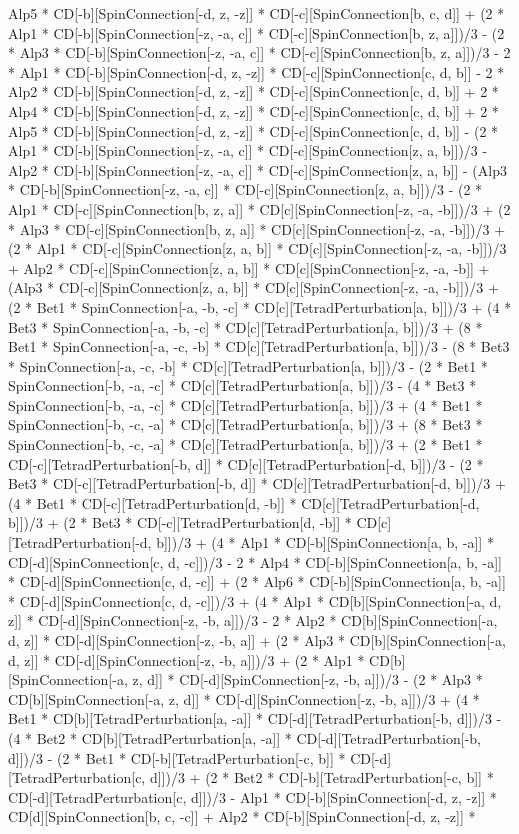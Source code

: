 Alp5 * CD[-b][SpinConnection[-d, z, -z]] * CD[-c][SpinConnection[b, c, d]] + (2 * Alp1 * CD[-b][SpinConnection[-z, -a, c]] * CD[-c][SpinConnection[b, z, a]])/3 - (2 * Alp3 * CD[-b][SpinConnection[-z, -a, c]] * CD[-c][SpinConnection[b, z, a]])/3 - 2 * Alp1 * CD[-b][SpinConnection[-d, z, -z]] * CD[-c][SpinConnection[c, d, b]] - 2 * Alp2 * CD[-b][SpinConnection[-d, z, -z]] * CD[-c][SpinConnection[c, d, b]] + 2 * Alp4 * CD[-b][SpinConnection[-d, z, -z]] * CD[-c][SpinConnection[c, d, b]] + 2 * Alp5 * CD[-b][SpinConnection[-d, z, -z]] * CD[-c][SpinConnection[c, d, b]] - (2 * Alp1 * CD[-b][SpinConnection[-z, -a, c]] * CD[-c][SpinConnection[z, a, b]])/3 - Alp2 * CD[-b][SpinConnection[-z, -a, c]] * CD[-c][SpinConnection[z, a, b]] - (Alp3 * CD[-b][SpinConnection[-z, -a, c]] * CD[-c][SpinConnection[z, a, b]])/3 - (2 * Alp1 * CD[-c][SpinConnection[b, z, a]] * CD[c][SpinConnection[-z, -a, -b]])/3 + (2 * Alp3 * CD[-c][SpinConnection[b, z, a]] * CD[c][SpinConnection[-z, -a, -b]])/3 + (2 * Alp1 * CD[-c][SpinConnection[z, a, b]] * CD[c][SpinConnection[-z, -a, -b]])/3 + Alp2 * CD[-c][SpinConnection[z, a, b]] * CD[c][SpinConnection[-z, -a, -b]] + (Alp3 * CD[-c][SpinConnection[z, a, b]] * CD[c][SpinConnection[-z, -a, -b]])/3 + (2 * Bet1 * SpinConnection[-a, -b, -c] * CD[c][TetradPerturbation[a, b]])/3 + (4 * Bet3 * SpinConnection[-a, -b, -c] * CD[c][TetradPerturbation[a, b]])/3 + (8 * Bet1 * SpinConnection[-a, -c, -b] * CD[c][TetradPerturbation[a, b]])/3 - (8 * Bet3 * SpinConnection[-a, -c, -b] * CD[c][TetradPerturbation[a, b]])/3 - (2 * Bet1 * SpinConnection[-b, -a, -c] * CD[c][TetradPerturbation[a, b]])/3 - (4 * Bet3 * SpinConnection[-b, -a, -c] * CD[c][TetradPerturbation[a, b]])/3 + (4 * Bet1 * SpinConnection[-b, -c, -a] * CD[c][TetradPerturbation[a, b]])/3 + (8 * Bet3 * SpinConnection[-b, -c, -a] * CD[c][TetradPerturbation[a, b]])/3 + (2 * Bet1 * CD[-c][TetradPerturbation[-b, d]] * CD[c][TetradPerturbation[-d, b]])/3 - (2 * Bet3 * CD[-c][TetradPerturbation[-b, d]] * CD[c][TetradPerturbation[-d, b]])/3 + (4 * Bet1 * CD[-c][TetradPerturbation[d, -b]] * CD[c][TetradPerturbation[-d, b]])/3 + (2 * Bet3 * CD[-c][TetradPerturbation[d, -b]] * CD[c][TetradPerturbation[-d, b]])/3 + (4 * Alp1 * CD[-b][SpinConnection[a, b, -a]] * CD[-d][SpinConnection[c, d, -c]])/3 - 2 * Alp4 * CD[-b][SpinConnection[a, b, -a]] * CD[-d][SpinConnection[c, d, -c]] + (2 * Alp6 * CD[-b][SpinConnection[a, b, -a]] * CD[-d][SpinConnection[c, d, -c]])/3 + (4 * Alp1 * CD[b][SpinConnection[-a, d, z]] * CD[-d][SpinConnection[-z, -b, a]])/3 - 2 * Alp2 * CD[b][SpinConnection[-a, d, z]] * CD[-d][SpinConnection[-z, -b, a]] + (2 * Alp3 * CD[b][SpinConnection[-a, d, z]] * CD[-d][SpinConnection[-z, -b, a]])/3 + (2 * Alp1 * CD[b][SpinConnection[-a, z, d]] * CD[-d][SpinConnection[-z, -b, a]])/3 - (2 * Alp3 * CD[b][SpinConnection[-a, z, d]] * CD[-d][SpinConnection[-z, -b, a]])/3 + (4 * Bet1 * CD[b][TetradPerturbation[a, -a]] * CD[-d][TetradPerturbation[-b, d]])/3 - (4 * Bet2 * CD[b][TetradPerturbation[a, -a]] * CD[-d][TetradPerturbation[-b, d]])/3 - (2 * Bet1 * CD[-b][TetradPerturbation[-c, b]] * CD[-d][TetradPerturbation[c, d]])/3 + (2 * Bet2 * CD[-b][TetradPerturbation[-c, b]] * CD[-d][TetradPerturbation[c, d]])/3 - Alp1 * CD[-b][SpinConnection[-d, z, -z]] * CD[d][SpinConnection[b, c, -c]] + Alp2 * CD[-b][SpinConnection[-d, z, -z]] * 